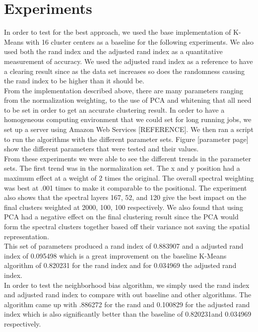 \documentclass[journal]{IEEEtran}
\begin{document}
\section{Experiments}
  In order to test for the best approach, we used the base implementation of K-Means with 16 cluster centers as a baseline for the following experiments. We also used both the rand index and the adjusted rand index as a quantitative measurement of accuracy. We used the adjusted rand index as a reference to have a clearing result since as the data set increases so does the randomness causing the rand index to be higher than it should be.\\

  From the implementation described above, there are many parameters ranging from the normalization weighting, to the use of PCA and whitening that all need to be set in order to get an accurate clustering result. In order to have a homogeneous computing environment that we could set for long running jobs, we set up a server using Amazon Web Services [REFERENCE]. We then ran a script to run the algorithms with the different parameter sets. Figure [parameter page] show the different parameters that were tested and their values.\\

  From these experiments we were able to see the different trends in the parameter sets. The first trend was in the normalization set. The x and y position had a maximum effect at a weight of 2 times the original. The overall spectral weighting was best at .001 times to make it comparable to the positional. The experiment also shows that the spectral layers 167, 52, and 120 give the best impact on the final clusters weighted at 2000, 100, 100 respectively. We also found that using PCA had a negative effect on the final clustering result since the PCA would form the spectral clusters together based off their variance not saving the spatial representation.\\

  This set of parameters produced a rand index of 0.883907 and a adjusted rand index of 0.095498 which is a great improvement on the baseline K-Means algorithm of 0.820231 for the rand index and for 0.034969 the adjusted rand index.\\

  In order to test the neighborhood bias algorithm, we simply used the rand index and adjusted rand index to compare with out baseline and other algorithms. The algorithm came up with .886272 for the rand and 0.100829 for the adjusted rand index which is also significantly better than the baseline of 0.820231and 0.034969 respectively.\\
\end{document}
